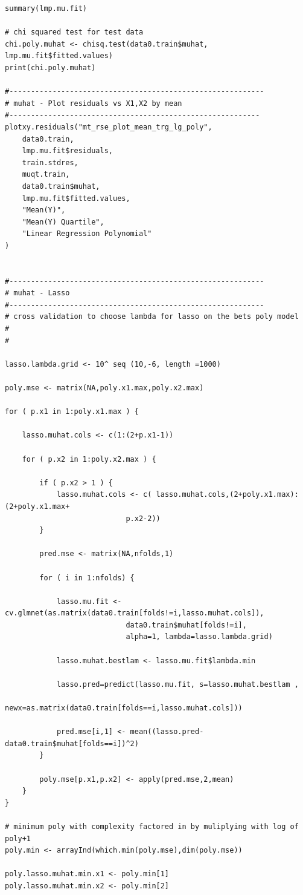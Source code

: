 \documentclass[twoside,12pt]{article}
\begin{document}
\begin{verbatim}
summary(lmp.mu.fit)

# chi squared test for test data
chi.poly.muhat <- chisq.test(data0.train$muhat, lmp.mu.fit$fitted.values)
print(chi.poly.muhat)

#-----------------------------------------------------------
# muhat - Plot residuals vs X1,X2 by mean
#----------------------------------------------------------
plotxy.residuals("mt_rse_plot_mean_trg_lg_poly",
	data0.train,
	lmp.mu.fit$residuals,
	train.stdres,
	muqt.train,
	data0.train$muhat,
	lmp.mu.fit$fitted.values,
	"Mean(Y)",
	"Mean(Y) Quartile",
	"Linear Regression Polynomial"
)


#-----------------------------------------------------------
# muhat - Lasso
#-----------------------------------------------------------
# cross validation to choose lambda for lasso on the bets poly model
#
# 

lasso.lambda.grid <- 10^ seq (10,-6, length =1000)

poly.mse <- matrix(NA,poly.x1.max,poly.x2.max)

for ( p.x1 in 1:poly.x1.max ) {

	lasso.muhat.cols <- c(1:(2+p.x1-1))

	for ( p.x2 in 1:poly.x2.max ) {
	
		if ( p.x2 > 1 ) {
			lasso.muhat.cols <- c( lasso.muhat.cols,(2+poly.x1.max):(2+poly.x1.max+
							p.x2-2))
		}

		pred.mse <- matrix(NA,nfolds,1)

		for ( i in 1:nfolds) {
	
			lasso.mu.fit <- cv.glmnet(as.matrix(data0.train[folds!=i,lasso.muhat.cols]),
							data0.train$muhat[folds!=i],
							alpha=1, lambda=lasso.lambda.grid)

			lasso.muhat.bestlam <- lasso.mu.fit$lambda.min

			lasso.pred=predict(lasso.mu.fit, s=lasso.muhat.bestlam , 
						newx=as.matrix(data0.train[folds==i,lasso.muhat.cols]))

			pred.mse[i,1] <- mean((lasso.pred-data0.train$muhat[folds==i])^2)
		}

		poly.mse[p.x1,p.x2] <- apply(pred.mse,2,mean)
	}
}

# minimum poly with complexity factored in by muliplying with log of poly+1
poly.min <- arrayInd(which.min(poly.mse),dim(poly.mse))

poly.lasso.muhat.min.x1 <- poly.min[1]
poly.lasso.muhat.min.x2 <- poly.min[2]




\end{verbatim}
\end{document}
